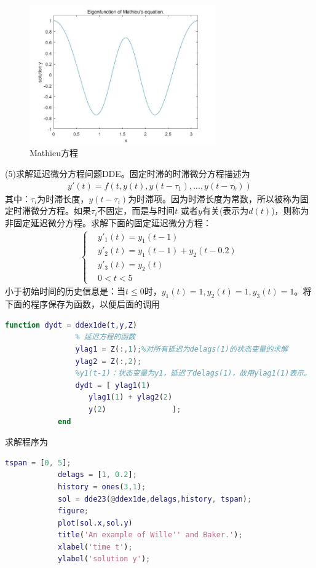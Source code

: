 			\begin{figure}[H]
	        \centering
	        \includegraphics[width=8cm]{images/odebianzhiwenti.jpg}
	        \caption{Mathieu方程}
	        \label{ode边值问题-求解Mathieu方程}
	        \end{figure}
	        (5)求解延迟微分方程问题DDE。固定时滞的时滞微分方程描述为
	        \begin{align*}
	        y'(t)=f(t,y(t),y(t-\tau_1),...,y(t-\tau_k))
	        \end{align*}
	        其中：$\tau_i$为时滞长度，$y(t-\tau_i)$为时滞项。因为时滞长度为常数，所以被称为固定时滞微分方程。如果$\tau_i$不固定，而是与时间$t$ 或者$y$有关(表示为$d(t)$)，则称为非固定延迟微分方程。求解下面的固定延迟微分方程：
	        \begin{align*}
			\left\{
			\begin{aligned}
			& y'_1(t) = y_1(t-1)\\
			& y'_2(t) = y_1(t-1)+y_2(t-0.2)\\
			& y'_3(t) = y_2(t)\\
			& 0<t<5
			\end{aligned}
			\right.
	        \end{align*}
	        小于初始时间的历史信息是：当$t \leqslant 0$时，$y_1(t) = 1,y_2(t) = 1,y_3(t) = 1$。将下面的程序保存为函数，以便后面的调用
	        \begin{lstlisting}[language = Matlab]
	         function dydt = ddex1de(t,y,Z)
		        % 延迟方程的函数
		        ylag1 = Z(:,1);%对所有延迟为delags(1)的状态变量的求解
		        ylag2 = Z(:,2);
		        %y1(t-1)：状态变量为y1，延迟了delags(1)，故用ylag1(1)表示。
		        dydt = [ ylag1(1)
		           ylag1(1) + ylag2(2)
		           y(2)               ];
		    end
	        \end{lstlisting}
	        求解程序为
	        \begin{lstlisting}[language = Matlab]
			tspan = [0, 5];
			delags = [1, 0.2];
			history = ones(3,1);
			sol = dde23(@ddex1de,delags,history, tspan);
			figure;
			plot(sol.x,sol.y)
			title('An example of Wille'' and Baker.');
			xlabel('time t');
			ylabel('solution y');
	        \end{lstlisting}

